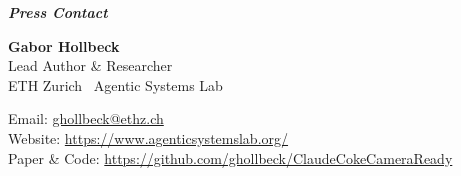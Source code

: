 \documentclass[11pt,a4paper]{article}
\begin{document}
\vspace{6pt}

{\fontsize{12}{15}\selectfont\textbf{\textit{Press Contact}}}

\vspace{-2pt}

{\linespread{1.05}\selectfont
\textbf{Gabor Hollbeck}\\
Lead Author \& Researcher\\
ETH Zurich \textperiodcentered\ Agentic Systems Lab

\vspace{8pt}

Email: \href{mailto:ghollbeck@ethz.ch}{ghollbeck@ethz.ch}\\
Website: \href{https://www.agenticsystemslab.org/}{https://www.agenticsystemslab.org/}\\
Paper \& Code: \href{https://github.com/ghollbeck/ClaudeCokeCameraReady}{https://github.com/ghollbeck/ClaudeCokeCameraReady}
\par}
\end{document}
